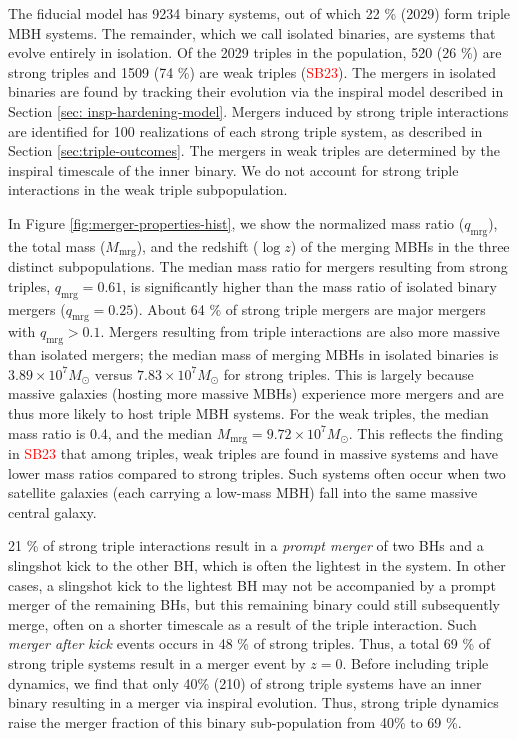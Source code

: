\documentclass[11pt, letterpaper]{article}
\newcommand{\SB}{\textcolor{red}{SB23}}
\begin{document}
The fiducial model has 9234 binary systems, out of which 22 \% (2029) form triple MBH systems. The remainder, which we call isolated binaries, are systems that evolve entirely in isolation. Of the 2029 triples in the population,
520 (26 \%) are strong triples and 1509 (74 \%) are weak triples (\SB{}). The mergers in isolated binaries are found by tracking their evolution via the inspiral model described in Section \ref{sec: insp-hardening-model}. Mergers induced by strong triple interactions are identified for 100 realizations of each strong triple system, as described in Section \ref{sec:triple-outcomes}. The mergers in weak triples are determined by the inspiral timescale of the inner binary. We do not account for strong triple interactions in the weak triple subpopulation.


In Figure \ref{fig:merger-properties-hist}, we show the normalized mass ratio ($q_{\text{mrg}}$), the total mass ($M_{\text{mrg}}$), and the redshift ($\log z$) of the merging MBHs in the three distinct subpopulations. The median mass ratio for mergers resulting from strong triples, $q_{\text{mrg}} = 0.61$, is significantly higher than the mass ratio of isolated binary mergers ($q_{\text{mrg}} = 0.25$). About 64 \% of strong triple mergers are major mergers with $q_{\text{mrg}} > 0.1$. Mergers resulting from triple interactions are also more massive than isolated mergers; the median mass of merging MBHs in isolated binaries is $3.89 \times 10^7 M_{\odot}$ versus $7.83 \times 10^7 M_{\odot}$ for strong triples.
This is largely because massive galaxies (hosting more massive MBHs) experience more mergers and are thus more likely to host triple MBH systems.
For the weak triples, the median mass ratio is 0.4, and the median  $M_{\text{mrg}} = 9.72 \times 10^7 M_{\odot}$. This reflects the finding in \SB{} that among triples, weak triples are found in massive systems and have lower mass ratios compared to strong triples. Such systems often occur when two satellite galaxies (each carrying a low-mass MBH) fall into the same massive central galaxy.


21 \% of strong triple interactions result in a \emph{prompt merger} of two BHs and a slingshot kick to the other BH, which is often the lightest in the system.  In other cases, a slingshot kick to the lightest BH may not be accompanied by a prompt merger of the remaining BHs, but this remaining binary could still subsequently merge, often on a shorter timescale as a result of the triple interaction. Such \emph{merger after kick} events occurs in 48 \% of strong triples. Thus, a total 69 \% of strong triple systems result in a merger event by $z=0$. Before including triple dynamics, we find that only 40\% (210) of strong triple systems have an inner binary resulting in a merger via inspiral evolution. Thus, strong triple dynamics raise the merger fraction of this binary sub-population from 40\% to 69 \%.
\end{document}
